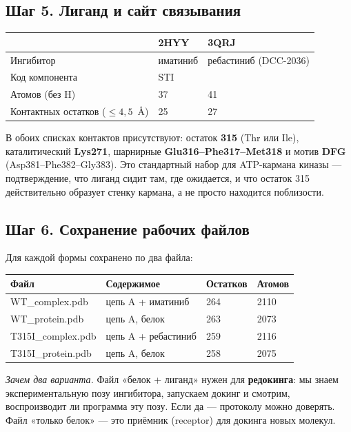 \documentclass[12pt,a4paper]{article}
\newcommand{\code}[1]{{\ttfamily #1}}
\begin{document}
\subsection{Шаг 5. Лиганд и сайт связывания}

\begin{center}
\begin{tabular}{L{4.8cm}L{4.8cm}L{4.8cm}}
\toprule
 & \textbf{2HYY} & \textbf{3QRJ} \\
\midrule
Ингибитор & иматиниб & ребастиниб (DCC-2036) \\
Код компонента & \code{STI} & \code{919} \\
Атомов (без H) & 37 & 41 \\
Контактных остатков ($\le 4{,}5$~\AA) & 25 & 27 \\
\bottomrule
\end{tabular}
\end{center}

В обоих списках контактов присутствуют: остаток \textbf{315} (Thr или Ile),
каталитический \textbf{Lys271}, шарнирные \textbf{Glu316--Phe317--Met318} и мотив
\textbf{DFG} (Asp381--Phe382--Gly383). Это стандартный набор для ATP-кармана
киназы --- подтверждение, что лиганд сидит там, где ожидается, и что остаток 315
действительно образует стенку кармана, а не просто находится поблизости.

\subsection{Шаг 6. Сохранение рабочих файлов}

Для каждой формы сохранено по два файла:

\begin{center}
\begin{tabular}{L{5.2cm}L{4.4cm}L{2.2cm}L{2.0cm}}
\toprule
\textbf{Файл} & \textbf{Содержимое} & \textbf{Остатков} & \textbf{Атомов} \\
\midrule
\code{WT\_complex.pdb} & цепь A + иматиниб & 264 & 2110 \\
\code{WT\_protein.pdb} & цепь A, белок & 263 & 2073 \\
\code{T315I\_complex.pdb} & цепь A + ребастиниб & 259 & 2116 \\
\code{T315I\_protein.pdb} & цепь A, белок & 258 & 2075 \\
\bottomrule
\end{tabular}
\end{center}

\noindent\emph{Зачем два варианта.} Файл «белок + лиганд» нужен для
\textbf{редокинга}: мы знаем экспериментальную позу ингибитора, запускаем докинг и
смотрим, воспроизводит ли программа эту позу. Если да --- протоколу можно доверять.
Файл «только белок» --- это приёмник (receptor) для докинга новых молекул.
\end{document}
